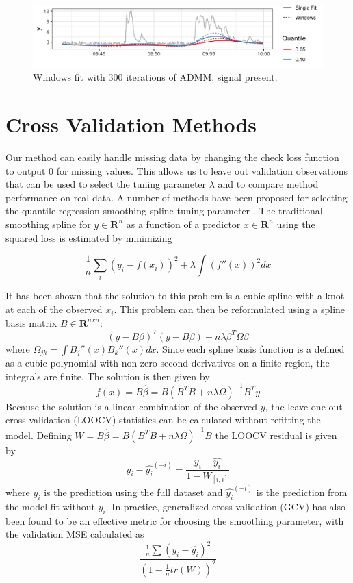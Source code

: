 \documentclass[12pt]{article}
\numberwithin{equation}{section}
\theoremstyle{plain}
\begin{document}
\begin{figure}[!h] 
	\caption{Windows fit with 300 iterations of ADMM, signal present.}
	\includegraphics[width = \linewidth]{Figures/admm_windows2.png}
\end{figure}

\pagebreak

\section {Cross Validation Methods}
Our method can easily handle missing data by changing the check loss function to output 0 for missing values. This allows us to leave out validation observations that can be used to select the tuning parameter $\lambda$ and to compare method performance on real data. A number of methods have been proposed for selecting the quantile regression smoothing spline tuning parameter \cite{yuan2006gacv}. The traditional smoothing spline for $y \in \mathbf{R}^n$ as a function of a predictor $x \in \mathbf{R}^n$ using the squared loss is estimated by minimizing 

\begin{equation}
\frac{1}{n}\sum_i (y_i - f(x_i))^2 + \lambda \int(f''(x))^2 dx
\end{equation}

It has been shown that the solution to this problem is a cubic spline with a knot at each of the observed $x_i$. This problem can then be reformulated using a spline basis matrix $B \in \mathbf{R}^{nxn}$: 
\begin{equation}
(y-B\beta)^T(y-B\beta) + n\lambda\beta^T\Omega\beta
\end{equation}  
where $\Omega_{jk} = \int B_j''(x)B_k''(x)dx$. Since each spline basis function is a defined as a cubic polynomial with non-zero second derivatives on a finite region, the integrals are finite. The solution is then given by 
$$f(x) = B\widehat{\beta} = B(B^TB + n\lambda\Omega)^{-1}B^Ty$$
Because the solution is a linear combination of the observed $y$, the leave-one-out cross validation (LOOCV) statistics can be calculated without refitting the model. Defining $W = B\widehat{\beta} = B(B^TB + n\lambda\Omega)^{-1}B$ the LOOCV residual is given by 
\begin{equation}
y_i - \widehat{y_i}^{(-i)} = \frac{y_i - \widehat{y_i}}{1-W_{[i,i]}}
\end{equation}
where $\widehat{y_i}$ is the prediction using the full dataset and $\widehat{y_i}^{(-i)}$ is the prediction from the model fit without $y_i$. In practice, generalized cross validation (GCV) has also been found to be an effective metric for choosing the smoothing parameter, with the validation MSE calculated as 
\begin{equation}
\frac{\frac{1}{n}\sum(y_i-\widehat{y_i})^2}{(1-\frac{1}{n}tr(W))^2}
\end{equation}
\end{document}
